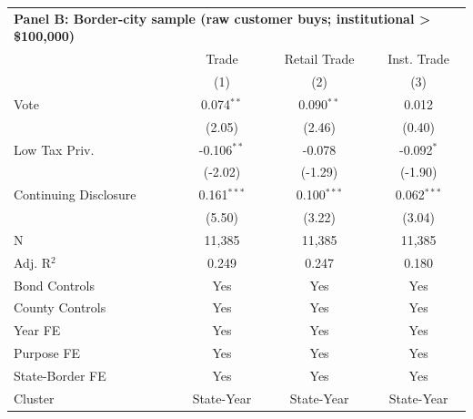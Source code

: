 \begingroup
\centering
\begin{tabular*}{\textwidth}{@{\extracolsep{\fill}}lccc}
\multicolumn{5}{l}{\textbf{Panel B: Border-city sample (raw customer buys; institutional > \$100,000)}}\\

\addlinespace
   \toprule
                         & Trade         & Retail Trade  & Inst. Trade\\  
                         & (1)           & (2)           & (3)\\  
   \midrule 
   Vote                  & 0.074$^{**}$  & 0.090$^{**}$  & 0.012\\   
                         & (2.05)       & (2.46)       & (0.40)\\   
   Low Tax Priv.         & -0.106$^{**}$ & -0.078        & -0.092$^{*}$\\   
                         & (-2.02)      & (-1.29)      & (-1.90)\\   
   Continuing Disclosure & 0.161$^{***}$ & 0.100$^{***}$ & 0.062$^{***}$\\   
                         & (5.50)       & (3.22)       & (3.04)\\   
   \hline
   N          & 11,385        & 11,385        & 11,385\\  
   Adj. R$^2$        & 0.249         & 0.247         & 0.180\\  
   Bond Controls         & Yes           & Yes           & Yes\\  
   County Controls       & Yes           & Yes           & Yes\\  
   Year FE               & Yes           & Yes           & Yes\\  
   Purpose FE            & Yes           & Yes           & Yes\\  
   State-Border FE       & Yes           & Yes           & Yes\\  
   Cluster              & State-Year & State-Year & State-Year\\  
   \bottomrule
\end{tabular*}
\par\endgroup
